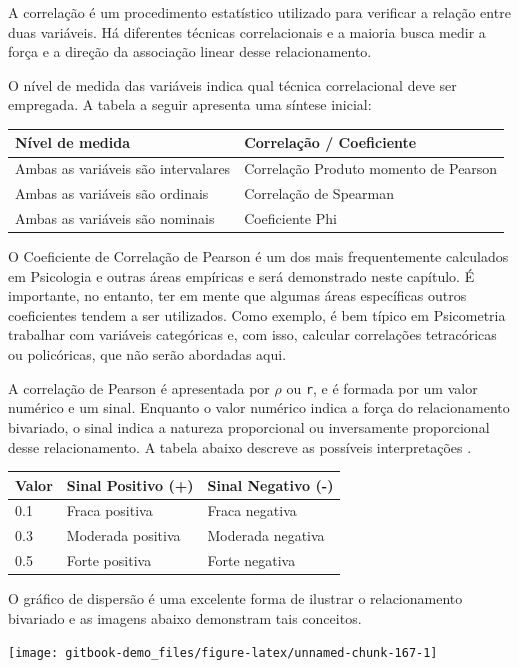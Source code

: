 \documentclass[
]{book}
\begin{document}
A correlação é um procedimento estatístico utilizado para verificar a relação entre duas variáveis. Há diferentes técnicas correlacionais e a maioria busca medir a força e a direção da associação linear desse relacionamento.

O nível de medida das variáveis indica qual técnica correlacional deve ser empregada. A tabela a seguir apresenta uma síntese inicial:

\begin{longtable}[]{@{}ll@{}}
\toprule
Nível de medida & Correlação / Coeficiente\tabularnewline
\midrule
\endhead
Ambas as variáveis são intervalares & Correlação Produto momento de Pearson\tabularnewline
Ambas as variáveis são ordinais & Correlação de Spearman\tabularnewline
Ambas as variáveis são nominais & Coeficiente Phi\tabularnewline
\bottomrule
\end{longtable}

O Coeficiente de Correlação de Pearson é um dos mais frequentemente calculados em Psicologia e outras áreas empíricas e será demonstrado neste capítulo. É importante, no entanto, ter em mente que algumas áreas específicas outros coeficientes tendem a ser utilizados. Como exemplo, é bem típico em Psicometria trabalhar com variáveis categóricas e, com isso, calcular correlações tetracóricas ou policóricas, que não serão abordadas aqui.

A correlação de Pearson é apresentada por \(\rho\) ou \texttt{r}, e é formada por um valor numérico e um sinal. Enquanto o valor numérico indica a força do relacionamento bivariado, o sinal indica a natureza proporcional ou inversamente proporcional desse relacionamento. A tabela abaixo descreve as possíveis interpretações \citep{Cohen1988}.

\begin{longtable}[]{@{}lll@{}}
\toprule
Valor & Sinal Positivo (+) & Sinal Negativo (-)\tabularnewline
\midrule
\endhead
0.1 & Fraca positiva & Fraca negativa\tabularnewline
0.3 & Moderada positiva & Moderada negativa\tabularnewline
0.5 & Forte positiva & Forte negativa\tabularnewline
\bottomrule
\end{longtable}

O gráfico de dispersão é uma excelente forma de ilustrar o relacionamento bivariado e as imagens abaixo demonstram tais conceitos.

\begin{center}\texttt{[image: gitbook-demo\_files/figure-latex/unnamed-chunk-167-1]} \end{center}
\end{document}
